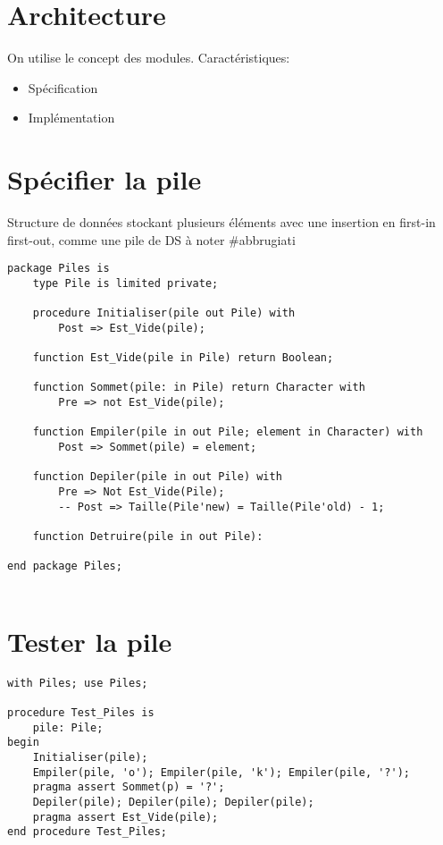 \documentclass{article}
\begin{document}
\section{Architecture}

On utilise le concept des modules. Caractéristiques:

\begin{itemize}
	\item Spécification
	\item Implémentation
\end{itemize}

\section{Spécifier la pile}

Structure de données stockant plusieurs éléments avec une insertion en first-in first-out, comme une pile de DS à noter \#abbrugiati

\begin{verbatim}
package Piles is
	type Pile is limited private;

	procedure Initialiser(pile out Pile) with
		Post => Est_Vide(pile);
	
	function Est_Vide(pile in Pile) return Boolean;

	function Sommet(pile: in Pile) return Character with
		Pre => not Est_Vide(pile);
	
	function Empiler(pile in out Pile; element in Character) with
		Post => Sommet(pile) = element;
	
	function Depiler(pile in out Pile) with
		Pre => Not Est_Vide(Pile);
		-- Post => Taille(Pile'new) = Taille(Pile'old) - 1;
	
	function Detruire(pile in out Pile):

end package Piles;


\end{verbatim}

\section{Tester la pile}

\begin{verbatim}
with Piles; use Piles;

procedure Test_Piles is
	pile: Pile;
begin
	Initialiser(pile);
	Empiler(pile, 'o'); Empiler(pile, 'k'); Empiler(pile, '?');
	pragma assert Sommet(p) = '?';
	Depiler(pile); Depiler(pile); Depiler(pile);
	pragma assert Est_Vide(pile);
end procedure Test_Piles;
\end{verbatim}
\end{document}
